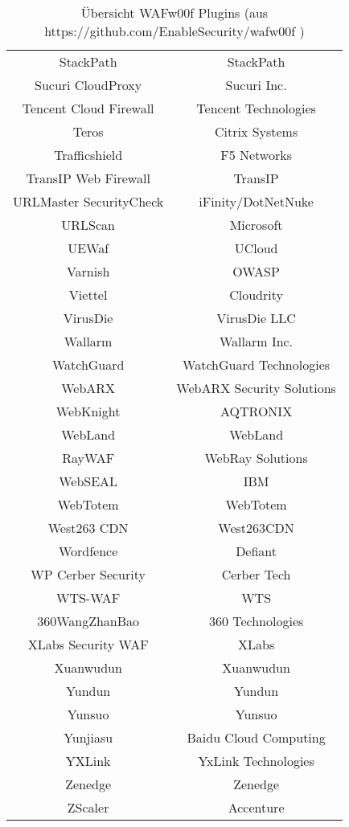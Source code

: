 \begin{table}[h]
\begin{tabular}{|c | c |}
  StackPath                       & StackPath\\
  Sucuri CloudProxy               & Sucuri Inc.\\
  Tencent Cloud Firewall          & Tencent Technologies\\
  Teros                           & Citrix Systems\\
      Trafficshield                   & F5 Networks\\
      TransIP Web Firewall            & TransIP\\
  URLMaster SecurityCheck         & iFinity/DotNetNuke\\
  URLScan                         & Microsoft\\
  UEWaf                           & UCloud\\
  Varnish                         & OWASP\\
  Viettel                         & Cloudrity\\
  VirusDie                        & VirusDie LLC\\
  Wallarm                         & Wallarm Inc.\\
  WatchGuard                      & WatchGuard Technologies\\
  WebARX                          & WebARX Security Solutions\\
  WebKnight                       & AQTRONIX\\
  WebLand                         & WebLand\\
  RayWAF                          & WebRay Solutions\\
  WebSEAL                         & IBM\\
  WebTotem                        & WebTotem\\
  West263 CDN                     & West263CDN\\
  Wordfence                       & Defiant\\
  WP Cerber Security              & Cerber Tech\\
  WTS-WAF                         & WTS\\
  360WangZhanBao                  & 360 Technologies\\
  XLabs Security WAF              & XLabs\\
  Xuanwudun                       & Xuanwudun\\
  Yundun                          & Yundun\\
  Yunsuo                          & Yunsuo\\
  Yunjiasu                        & Baidu Cloud Computing\\
  YXLink                          & YxLink Technologies\\
  Zenedge                         & Zenedge\\
  ZScaler                         & Accenture\\
      \hline
      
      
\end{tabular}
    \caption{Übersicht WAFw00f Plugins (aus https://github.com/EnableSecurity/wafw00f ) }
    \label{tab:my_label}
\end{table}


